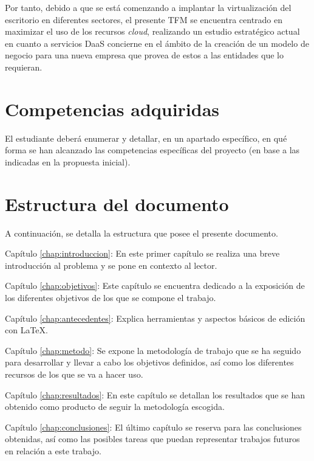 Por tanto, debido a que se está comenzando a implantar la virtualización del escritorio en diferentes sectores, el presente \acf{TFM} se encuentra centrado en maximizar el uso de los recursos \textit{cloud}, realizando un estudio estratégico actual en cuanto a servicios \acs{DaaS} concierne en el ámbito de la creación de un modelo de negocio para una nueva empresa que provea de estos a las entidades que lo requieran.

\clearpage

\section{Competencias adquiridas}
El estudiante deberá enumerar y detallar, en un apartado específico, en qué
forma se han alcanzado las competencias específicas del proyecto (en base a las
indicadas en la propuesta inicial).


\section{Estructura del documento}

A continuación, se detalla la estructura que posee el presente documento.

\begin{definitionlist}
    \item[Capítulo \ref{chap:introduccion}: \nameref{chap:introduccion}] En este primer capítulo se realiza una breve introducción al problema y se pone en contexto al lector.
    \item[Capítulo \ref{chap:objetivos}: \nameref{chap:objetivos}] Este capítulo se encuentra dedicado a la exposición de los diferentes objetivos de los que se compone el trabajo.
    \item[Capítulo \ref{chap:antecedentes}: \nameref{chap:antecedentes}] Explica
    herramientas y aspectos básicos de edición con \LaTeX.
    \item[Capítulo \ref{chap:metodo}: \nameref{chap:metodo}] Se expone la metodología de trabajo que se ha seguido para desarrollar y llevar a cabo los objetivos definidos, así como los diferentes recursos de los que se va a hacer uso.
    \item[Capítulo \ref{chap:resultados}: \nameref{chap:resultados}] En este capítulo se detallan los resultados que se han obtenido como producto de seguir la metodología escogida.
    \item[Capítulo \ref{chap:conclusiones}: \nameref{chap:conclusiones}] El último capítulo se reserva para las conclusiones obtenidas, así como las posibles tareas que puedan representar trabajos futuros en relación a este trabajo.
\end{definitionlist}


